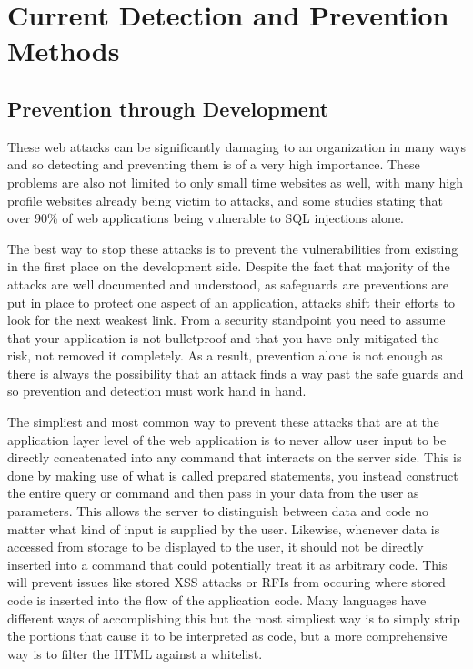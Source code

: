 \chapter{Current Detection and Prevention Methods}

\section{Prevention through Development}

These web attacks can be significantly damaging to an organization in many ways and so detecting and preventing them is of a very high importance.  These problems are also not limited to only small time websites as well, with many high profile websites already being victim to attacks, and some studies stating that over 90\% of web applications being vulnerable to SQL injections alone. %

The best way to stop these attacks is to prevent the vulnerabilities from existing in the first place on the development side.  Despite the fact that majority of the attacks are well documented and understood, as safeguards are preventions are put in place to protect one aspect of an application, attacks shift their efforts to look for the next weakest link.  From a security standpoint you need to assume that your application is not bulletproof and that you have only mitigated the risk, not removed it completely.  As a result, prevention alone is not enough as there is always the possibility that an attack finds a way past the safe guards and so prevention and detection must work hand in hand.

The simpliest and most common way to prevent these attacks that are at the application layer level of the web application is to never allow user input to be directly concatenated into any command that interacts on the server side.  This is done by making use of what is called prepared statements, you instead construct the entire query or command and then pass in your data from the user as parameters.  This allows the server to distinguish between data and code no matter what kind of input is supplied by the user.  Likewise, whenever data is accessed from storage to be displayed to the user, it should not be directly inserted into a command that could potentially treat it as arbitrary code.  This will prevent issues like stored XSS attacks or RFIs from occuring where stored code is inserted into the flow of the application code.  %
Many languages have different ways of accomplishing this but the most simpliest way is to simply strip the portions that cause it to be interpreted as code, but a more comprehensive way is to filter the HTML against a whitelist. %

